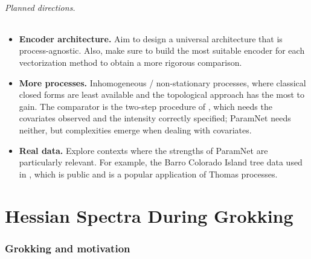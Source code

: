 \documentclass[11pt,a4paper]{article}
\begin{document}
\paragraph{Planned directions.}
\begin{itemize}[leftmargin=*,itemsep=2pt]
    \item \textbf{Encoder architecture.} Aim to design a universal architecture that is process-agnostic. Also, make sure to build the most suitable encoder for each vectorization method to obtain a more rigorous comparison.
    \item \textbf{More processes.} Inhomogeneous / non-stationary processes, where classical closed forms
    are least available and the topological approach has the most to gain. The comparator is the two-step procedure of \citet{waagepetersen2009twostep}, which needs the covariates observed and the intensity correctly specified; ParamNet needs neither, but complexities emerge when dealing with covariates.
    \item \textbf{Real data.} Explore contexts where the strengths of ParamNet are particularly relevant. For example, the Barro Colorado Island tree data used in \citet{waagepetersen2009twostep}, which is public and is a popular application of Thomas processes.
\end{itemize}

\newpage

\part{Hessian Spectra During Grokking}

\section{Grokking and motivation}
\label{sec:hess-intro}
\end{document}
